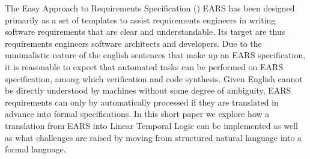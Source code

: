 The Easy Approach to Requirements Specification (\ears)
EARS\cite{earsctrlProcess}\cite{LucioRCA16}\cite{LucioRAM17} has
been designed primarily as a set of templates to assist requirements engineers
in writing software requirements that are clear and understandable.
Its target are thus requirements engineers software architects and developers.
Due to the minimalistic nature of the english sentences that make up an EARS
specification, it is reasonable to expect that automated tasks can be performed
on EARS specification, among which verification and code synthesis. Given
English cannot be directly understood by machines without some degree of
ambiguity, EARS requirements can only by automatically processed if they are
translated in advance into formal specifications. In this short paper we explore
how a translation from EARS into Linear Temporal Logic can be implemented as
well as what challenges are raised by moving from structured natural language
into a formal language.